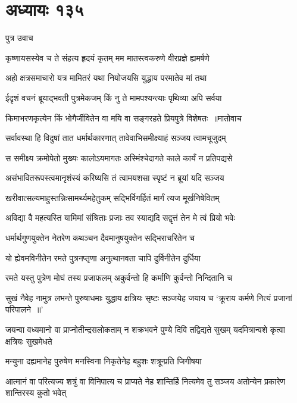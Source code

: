 \chapter{अध्यायः १३५}
\twolineshloka
{पुत्र उवाच}
{}


\twolineshloka
{कृष्णायसस्येव च ते संहत्य हृदयं कृतम्}
{मम मातस्त्वकरुणे वीरप्रज्ञे ह्यमर्षणे}


\twolineshloka
{अहो क्षत्रसमाचारो यत्र मामितरं यथा}
{नियोजयसि युद्धाय परमातेव मां तथा}


\twolineshloka
{ईदृशं वचनं ब्रूयाद्भवती पुत्रमेकजम्}
{किं नु ते मामपश्यन्त्याः पृथिव्या अपि सर्वया}


\threelineshloka
{किमाभरणकृत्येन किं भोगैर्जीवितेन वा}
{मयि वा सङ्गरहते प्रियपुत्रे विशेषतः ॥मातोवाच}
{}


\twolineshloka
{सर्वावस्था हि विदुषां तात धर्मार्थकारणात्}
{तावेवाभिसमीक्ष्याहं सञ्जय त्वामचूजुदम्}


\twolineshloka
{स समीक्ष्य क्रमोपेतो मुख्यः कालोऽयमागतः}
{अस्मिंश्चेदागते काले कार्यं न प्रतिपद्यसे}


\twolineshloka
{असंभावितरूपस्त्वमानृशंस्यं करिष्यसि}
{तं त्वामयशसा स्पृष्टं न ब्रूयां यदि सञ्जय}


\twolineshloka
{खरीवात्सल्यमाहुस्तन्निःसामर्थ्यमहेतुकम्}
{सद्भिर्विगर्हितं मार्गं त्यज मूर्खनिषेवितम्}


\twolineshloka
{अविद्या वै महत्यस्ति यामिमां संश्रिताः प्रजाः}
{तव स्याद्यदि सद्वृत्तं तेन मे त्वं प्रियो भवेः}


\twolineshloka
{धर्मार्थगुणयुक्तेन नेतरेण कथञ्चन}
{दैवमानुषयुक्तेन सद्भिराचरितेन च}


\twolineshloka
{यो ह्येवमविनीतेन रमते पुत्रनप्तृणा}
{अनुत्थानवता चापि दुर्विनीतेन दुर्धिया}


\twolineshloka
{रमते यस्तु पुत्रेण मोघं तस्य प्रजाफलम्}
{अकुर्वन्तो हि कर्माणि कुर्वन्तो निन्दितानि च}


\threelineshloka
{सुखं नैवेह नामुत्र लभन्ते पुरुषाधमाः}
{युद्धाय क्षत्रियः सृष्टः सञ्जयेह जयाय च}
{`क्रूराय कर्मणे नित्यं प्रजानां परिपालने ॥'}


\threelineshloka
{जयन्वा वध्यमानो वा प्राप्नोतीन्द्रसलोकताम्}
{न शक्रभवने पुण्ये दिवि तद्विद्यते सुखम्}
{यदमित्रान्वशे कृत्वा क्षत्रियः सुखमेधते}


\twolineshloka
{मन्युना दह्यमानेह पुरुषेण मनस्विना}
{निकृतेनेह बहुशः शत्रून्प्रति जिगीषया}


\threelineshloka
{आत्मानं वा परित्यज्य शत्रुं वा विनिपात्य च}
{प्राप्यते नेह शान्तिर्हि नित्यमेव तु सञ्जय}
{अतोन्येन प्रकारेण शान्तिरस्य कुतो भवेत्}


